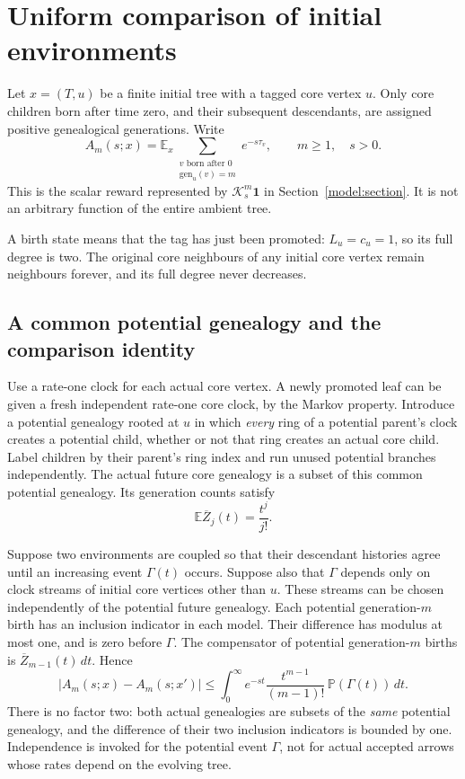 \section{Uniform comparison of initial environments}

Let $x=(T,u)$ be a finite initial tree with a tagged core vertex $u$.
Only core children born after time zero, and their subsequent descendants,
are assigned positive genealogical generations. Write
\[
 A_m(s;x)=
 \mathbb E_x\sum_{\substack{v\text{ born after }0\\
                          \mathrm{gen}_u(v)=m}}
 e^{-s\tau_v},\qquad m\ge1,\quad s>0.
\]
This is the scalar reward represented by $\mathcal K_s^m\mathbf1$
in Section~\ref{model:section}.
It is not an arbitrary function of the entire ambient tree.

A birth state means that the tag has just been promoted: $L_u=c_u=1$,
so its full degree is two. The original core neighbours of any initial
core vertex remain neighbours forever, and its full degree never
decreases.

\subsection{A common potential genealogy and the comparison identity}

Use a rate-one clock for each actual core vertex. A newly promoted leaf
can be given a fresh independent rate-one core clock, by the Markov
property. Introduce a potential genealogy rooted at $u$ in which
\emph{every} ring of a potential parent's clock creates a potential child,
whether or not that ring creates an actual core child. Label children by
their parent's ring index and run unused potential branches independently.
The actual future core genealogy is a subset of this common potential
genealogy. Its generation counts satisfy
\[
 \mathbb E\overline Z_j(t)=\frac{t^j}{j!}.
\]

Suppose two environments are coupled so that their descendant histories
agree until an increasing event $\Gamma(t)$ occurs. Suppose also that
$\Gamma$ depends only on clock streams of initial core vertices other
than $u$. These streams can be chosen independently of the potential
future genealogy. Each potential generation-$m$ birth has an inclusion
indicator in each model. Their difference has modulus at most one, and
is zero before $\Gamma$. The compensator of potential generation-$m$
births is $\overline Z_{m-1}(t)\,dt$. Hence
\begin{equation}\label{env:comparison}
 \boxed{
 |A_m(s;x)-A_m(s;x')|
 \le
 \int_0^\infty e^{-st}
 \frac{t^{m-1}}{(m-1)!}\,
 \mathbb P(\Gamma(t))\,dt .
 }
\end{equation}
There is no factor two: both actual genealogies are subsets of the
\emph{same} potential genealogy, and the difference of their two
inclusion indicators is bounded by one. Independence is invoked for the
potential event $\Gamma$, not for actual accepted arrows whose rates
depend on the evolving tree.

